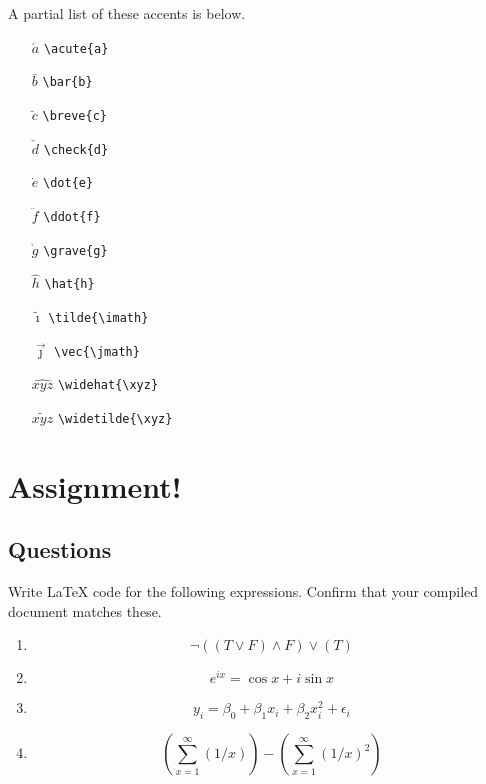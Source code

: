 A partial list of these accents is below.
\begin{multicols}{3}
\begin{itemize}
\item[$\acute{a}$] \texttt{\textbackslash acute\{a\}}
\item[$\bar{b}$] \texttt{\textbackslash bar\{b\}}
\item[$\breve{c}$] \texttt{\textbackslash breve\{c\}}
\item[$\check{d}$] \texttt{\textbackslash check\{d\}}
\item[$\dot{e}$] \texttt{\textbackslash dot\{e\}}
\item[$\ddot{f}$] \texttt{\textbackslash ddot\{f\}}
\item[$\grave{g}$] \texttt{\textbackslash grave\{g\}}
\item[$\hat{h}$] \texttt{\textbackslash hat\{h\}}
\item[$\tilde{\imath}$] \texttt{\textbackslash tilde\{\textbackslash imath\}}
\item[$\vec{\jmath}$] \texttt{\textbackslash vec\{\textbackslash jmath\}}
\item[$\widehat{xyz}$] \texttt{\textbackslash widehat\{\textbackslash xyz\}}
\item[$\widetilde{xyz}$] \texttt{\textbackslash widetilde\{\textbackslash xyz\}}

\end{itemize}
\end{multicols}

\section{Assignment!}

\subsection*{Questions}

Write \LaTeX{} code for the following expressions. Confirm that your compiled
document matches these.

\begin{enumerate}
\item
\[
\neg\left(\left(T \vee F\right) \wedge F\right) \vee \left( T \right)
\]

\item
\[
e^{ix} = \cos x + i \sin x
\]

\item
\[
y_i = \beta_0 + \beta_1 x_i + \beta_2 x_i^2 + \epsilon_i
\]

\item
\[
\left(\sum_{x=1}^{\infty} (1/x) \right) - \left(\sum_{x=1}^{\infty}
  (1/x)^2 \right)
\]
\end{enumerate}

